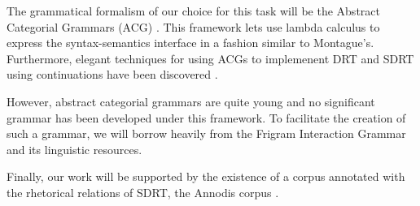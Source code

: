 The grammatical formalism of our choice for this task will be the
Abstract Categorial Grammars (ACG) \cite{de2001towards}. This framework
lets use lambda calculus to express the syntax-semantics interface in a
fashion similar to Montague's. Furthermore, elegant techniques for using
ACGs to implemenent DRT and SDRT using continuations have been
discovered \cite{de2006towards} \cite{asher2011sdrt}
\cite{asher2011montagovian}.

However, abstract categorial grammars are quite young and no significant
grammar has been developed under this framework. To facilitate the
creation of such a grammar, we will borrow heavily from the Frigram
Interaction Grammar \cite{perrier2007french} and its linguistic
resources.

Finally, our work will be supported by the existence of a corpus
annotated with the rhetorical relations of SDRT, the Annodis corpus
\cite{afantenos2012empirical}.
